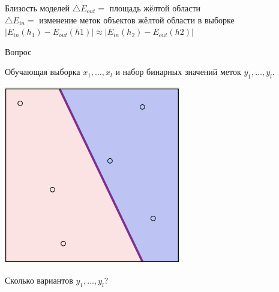 \documentclass[10pt]{beamer}
\begin{document}

\begin{frame}{Близость моделей}  
  $\bigtriangleup E_{out} = $ площадь жёлтой области\\
  \bigbreak
  $\bigtriangleup E_{in} = $ изменение меток объектов жёлтой области в выборке\\
  \bigbreak
  $\vert E_{in}(h_1) - E_{out}(h1) \vert \approx \vert E_{in}(h_2) - E_{out}(h2) \vert$  
\end{frame}

\begin{frame}{Вопрос}  
  \begin{minipage}[t]{0.5\linewidth}
    \begin{flushleft}
    Обучающая выборка $x_1, \dots, x_l$ и набор бинарных значений меток $y_1,\dots,y_l$.\\
    \end{flushleft}
  \end{minipage}%
  \begin{minipage}{0.5\linewidth}
      \centering
        \includegraphics[width=0.8 \textwidth, keepaspectratio]{images/dich}    
  \end{minipage}%
  \centering  
  \bigbreak
  Сколько вариантов $y_1,\dots, y_l$? 
\end{frame}
\end{document}
